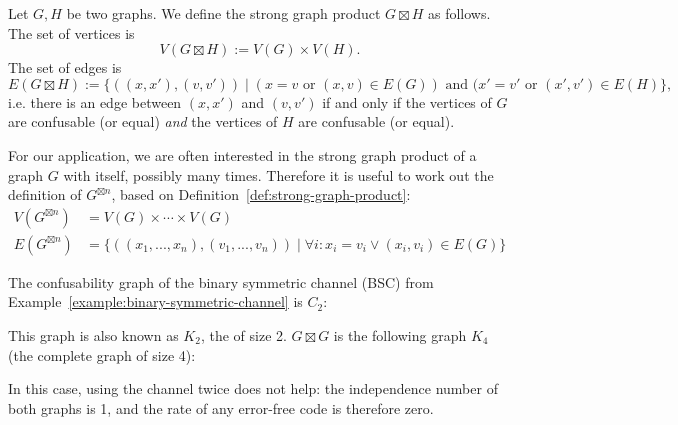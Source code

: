 \begin{definition}\label{def:strong-graph-product}
Let $G, H$ be two graphs. We define the strong graph product $G \boxtimes H$ as follows. The set of vertices is
\[
V(G \boxtimes H) := V(G) \times V(H).
\]
The set of edges is
\[
E(G \boxtimes H) := \{((x,x'),(v,v')) \mid (x = v \mbox{ or } (x,v) \in E(G)) \mbox{ and } (x'=v' \mbox{ or } (x',v') \in E(H)\},
\]
i.e. there is an edge between $(x,x')$ and $(v,v')$ if and only if the vertices of $G$ are confusable (or equal) \emph{and} the vertices of $H$ are confusable (or equal).
\end{definition}
For our application, we are often interested in the strong graph product of a graph $G$ with itself, possibly many times. Therefore it is useful to work out the definition of $G^{\boxtimes n}$, based on Definition~\ref{def:strong-graph-product}:
\begin{align}
V(G^{\boxtimes n}) &= V(G) \times \cdots \times V(G)\\
E(G^{\boxtimes n}) &= \{((x_1, ..., x_n),(v_1, ..., v_n))  \mid \forall i : x_i = v_i \vee (x_i,v_i) \in E(G)\}
\end{align}



\begin{example}\label{example:bsc-graph}
The confusability graph of the binary symmetric channel (BSC) from Example~\ref{example:binary-symmetric-channel} is $C_2$:
\begin{center}
\end{center}
This graph is also known as $K_2$, the  of size 2. $G \boxtimes G$ is the following graph $K_4$ (the complete graph of size 4):
\begin{center}
\end{center}
In this case, using the channel twice does not help: the independence number of both graphs is 1, and the rate of any error-free code is therefore zero.
\end{example}

